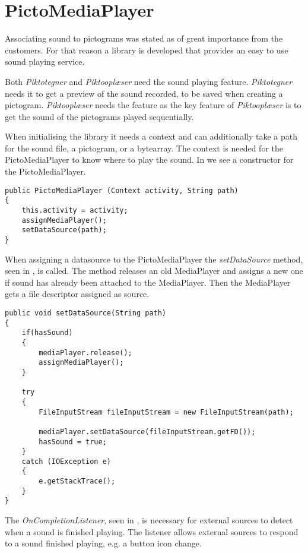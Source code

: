 \section{PictoMediaPlayer}
\label{sec:pictomediaplayer}
Associating sound to pictograms was stated as of great importance from the customers.
For that reason a library is developed that provides an easy to use sound playing service.

Both \textit{Piktotegner} and \textit{Piktooplæser} need the sound playing feature. 
\textit{Piktotegner} needs it to get a preview of the sound recorded, to be saved when creating a pictogram.
\textit{Piktooplæser} needs the feature as the key feature of \textit{Piktooplæser} is to get the sound of the pictograms played sequentially. 

When initialising the library it needs a context and can additionally take a path for the sound file, a pictogram, or a bytearray. 
The context is needed for the PictoMediaPlayer to know where to play the sound.
In  we see a constructor for the PictoMediaPlayer.

\begin{lstlisting}[caption={Constructor for PictoMediaPlayer.},label={lst:constructor}]
public PictoMediaPlayer (Context activity, String path)
{
    this.activity = activity;
    assignMediaPlayer();
    setDataSource(path);
}
\end{lstlisting}

When assigning a datasource to the PictoMediaPlayer the \textit{setDataSource} method, seen in , is called. The method releases an old MediaPlayer and assigns a new one if sound has already been attached to the MediaPlayer.
Then the MediaPlayer gets a file descriptor assigned as source.

\begin{lstlisting}[caption={SetDataSource method of PictoMediaPlayer.},label={lst:setdatasource}]
public void setDataSource(String path)
{
    if(hasSound)
    {
        mediaPlayer.release();
        assignMediaPlayer();
    }

    try
    {
        FileInputStream fileInputStream = new FileInputStream(path);

        mediaPlayer.setDataSource(fileInputStream.getFD());
        hasSound = true;
    }
    catch (IOException e)
    {
        e.getStackTrace();
    }
}
\end{lstlisting}

The \textit{OnCompletionListener}, seen in , is necessary for external sources to detect when a sound is finished playing. The listener allows external sources to respond to a sound finished playing, e.g. a button icon change.

